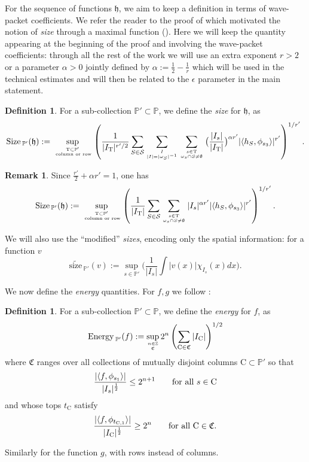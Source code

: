 \documentclass[a4paper,11pt,oneside]{amsart}
\newcommand{\hh}{\mathfrak{h}}
\newcommand{\PP}{\mathbb{P}}
\newcommand{\CC}{\mathrm{C}}
\newcommand{\TT}{\mathrm{T}}
\newcommand{\size}{\mathrm{Size\, }}
\newcommand{\ssize}{\widetilde{\mathrm{size}\,}}
\newcommand{\energy}{\mathrm{Energy \,}}
\theoremstyle{plain}
\theoremstyle{definition}
\newtheorem{definition}[theorem]{Definition}
\newtheorem{remark}[theorem]{Remark}
\begin{document}
For the sequence of functions $\hh$, we aim to keep a definition in terms of wave-packet coefficients. We refer the reader to the proof of \cite[Proposition 2.5]{BB} which motivated the notion of {\it size} through a maximal function (\cite[Definition 3.2]{BB}). Here we will keep the quantity appearing at the beginning of the proof and involving the wave-packet coefficients: through all the rest of the work we will use an extra exponent $r>2$ or a parameter $\alpha>0$ jointly defined by $\alpha:=\frac{1}{2}-\frac{1}{r}$ which will be used  in the technical estimates and will then be related to the $\epsilon$ parameter in the main statement.

\begin{definition}
For a sub-collection $\PP' \subset \PP$, we define the {\it size} for $\hh$, as 
$$ \size_{\PP'}(\hh) := \sup_{\TT \subset \PP' \atop \textrm{ column or row}} \left(\frac{1}{|I_{\TT}|^{r'/2}} \sum_{S\in \mathcal{S}} \sum_{I \atop |I|=|\omega_S|^{-1}} \sum_{s\in \TT \atop \omega_s \cap S\neq \emptyset} \big(\frac{|I_s|}{|I_{\TT}|}\big)^{\alpha r'} |\langle h_S,\phi_{s_3}\rangle|^{r'}\right)^{1/r'}.$$ 
\end{definition}

\begin{remark}
Since $\frac{r'}{2}+\alpha r' = 1$, one has
$$ \size_{\PP'}(\hh) := \sup_{\TT \subset \PP' \atop \textrm{ column or row}} \left(\frac{1}{|I_{\TT}|} \sum_{S\in \mathcal{S}} \sum_{s\in \TT \atop \omega_s \cap S\neq \emptyset} |I_s|^{\alpha r'} |\langle h_S,\phi_{s_3}\rangle|^{r'}\right)^{1/r'}.$$ 
\end{remark}

We will also use the ``modified'' {\it sizes}, encoding only the spatial information: for a function $v$
$$ \ssize_{\PP'}(v):=\sup_{s\in \PP'} \Big(\frac{1}{|I_s|} \int |v(x)| \chi_{I_s}(x) dx \Big).$$

We now define the {\it energy} quantities. For $f,g$ we follow \cite[Definition 3.3]{BB}:

\begin{definition}
For a sub-collection $\PP' \subset \PP$, we define the {\it energy} for $f$, as 
$$\energy_{\PP'}(f):=\sup_{n\in{\mathbb Z} \atop \mathfrak{C}} 2^{n} \left(\sum_{\CC \in \mathfrak{C}} |I_{\CC}| \right)^{1/2}$$
where $\mathfrak{C}$ ranges over all collections of mutually disjoint columns $\CC\subset \PP'$ so that
$$ \frac{|\langle f, \phi_{s_1}\rangle |}{|I_s|^{1\over 2}} \leq 2^{n+1} \qquad \textrm{for all $s\in\CC$}$$
and whose tops $t_{\CC}$ satisfy
$$ \frac{|\langle f, \phi_{t_{\CC,1}}\rangle |}{|I_{\CC}|^{1\over 2}}\geq 2^{n} \qquad \textrm{for all $\CC\in\mathfrak{C}$}.$$

Similarly for the function $g$, with rows instead of columns.
\end{definition}
\end{document}
